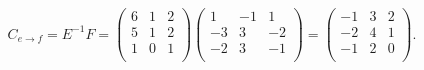 \begin{enumerate}
	      \[
		      C_{e \to f} = E^{-1} F =
		      \begin{pmatrix}
			      6 & 1 & 2 \\
			      5 & 1 & 2 \\
			      1 & 0 & 1 \\
		      \end{pmatrix}
		      \begin{pmatrix}
			      1  & -1 & 1  \\
			      -3 & 3  & -2 \\
			      -2 & 3  & -1 \\
		      \end{pmatrix} =
		      \begin{pmatrix}
			      -1 & 3 & 2 \\
			      -2 & 4 & 1 \\
			      -1 & 2 & 0 \\
		      \end{pmatrix}.
	      \]


\end{enumerate}
